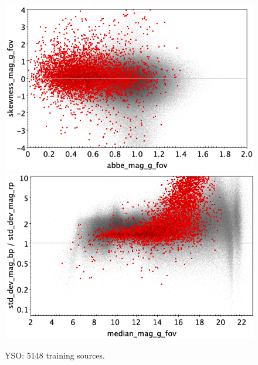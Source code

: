 \documentclass[longauth]{aa}
\begin{document}
\begin{appendix}
\begin{figure}
\vspace{4mm}
 \includegraphics[width=0.45\hsize]{figures/appendix/YSO_trn_ask.png}  %
\hspace{2mm}
 \includegraphics[width=0.45\hsize]{figures/appendix/YSO_trn_msdr.png}  \\ %
\vspace{4mm}
 \caption{YSO: 5148 training sources.}  
 \label{fig:app:YSO_trn}
\end{figure}


\end{appendix}
\end{document}
